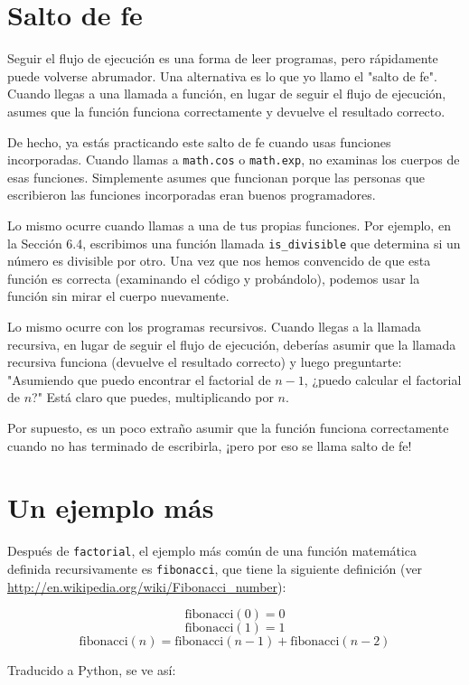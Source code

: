 \section{Salto de fe}

Seguir el flujo de ejecución es una forma de leer programas, pero rápidamente puede volverse abrumador. Una alternativa es lo que yo llamo el "salto de fe". Cuando llegas a una llamada a función, en lugar de seguir el flujo de ejecución, asumes que la función funciona correctamente y devuelve el resultado correcto.

De hecho, ya estás practicando este salto de fe cuando usas funciones incorporadas. Cuando llamas a \texttt{math.cos} o \texttt{math.exp}, no examinas los cuerpos de esas funciones. Simplemente asumes que funcionan porque las personas que escribieron las funciones incorporadas eran buenos programadores.

Lo mismo ocurre cuando llamas a una de tus propias funciones. Por ejemplo, en la Sección 6.4, escribimos una función llamada \texttt{is\_divisible} que determina si un número es divisible por otro. Una vez que nos hemos convencido de que esta función es correcta (examinando el código y probándolo), podemos usar la función sin mirar el cuerpo nuevamente.

Lo mismo ocurre con los programas recursivos. Cuando llegas a la llamada recursiva, en lugar de seguir el flujo de ejecución, deberías asumir que la llamada recursiva funciona (devuelve el resultado correcto) y luego preguntarte: "Asumiendo que puedo encontrar el factorial de $n-1$, ¿puedo calcular el factorial de $n$?" Está claro que puedes, multiplicando por $n$.

Por supuesto, es un poco extraño asumir que la función funciona correctamente cuando no has terminado de escribirla, ¡pero por eso se llama salto de fe!

\section{Un ejemplo más}

Después de \texttt{factorial}, el ejemplo más común de una función matemática definida recursivamente es \texttt{fibonacci}, que tiene la siguiente definición (ver \url{http://en.wikipedia.org/wiki/Fibonacci_number}):

\[
\text{fibonacci}(0) = 0
\]
\[
\text{fibonacci}(1) = 1
\]
\[
\text{fibonacci}(n) = \text{fibonacci}(n-1) + \text{fibonacci}(n-2)
\]

Traducido a Python, se ve así:

